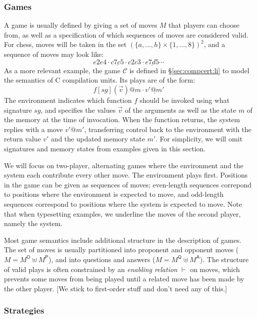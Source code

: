 \documentclass[acmsmall,timestamp,review,anonymous]{acmart}
\newcommand{\kw}[1]{\ensuremath{ \mathsf{#1} }}
\begin{document}

\subsubsection{Games} %

A game is usually defined by giving a set of moves $M$
that players can choose from,
as well as a specification of which
sequences of moves are considered valid.
For chess,
moves will be taken in the set $(\{a, \ldots, h\} \times \{1, \ldots, 8\})^2$,
and a sequence of moves may look like:
\[ e2e4 \cdot \underline{c7c5} \cdot c2c3 \cdot \underline{e7d5} \cdots \]
As a more relevant example,
the game $\mathcal{C}$ is defined in \S\ref{sec:compcert:li}
to model the semantics of C compilation units.
Its plays are of the form:
\[ f[sg](\vec{v})@m \cdot \underline{v'@m'} \]
The environment indicates
which function $f$ should be invoked
using what signature $sg$,
and specifies the values $\vec{v}$ of the arguments
as well as the state $m$ of the memory
at the time of invocation.
When the function returns,
the system replies with a move $v'@m'$,
transferring control back to the environment
with the return value $v'$
and the updated memory state $m'$.
For simplicity,
we will omit signatures and memory states
from examples given in this section.

We will focus on two-player, alternating games
where the environment and the system each contribute every other move.
The environment plays first.
Positions in the game can be given
as sequences of moves;
even-length sequences correpond to positions
where the environment is expected to move,
and odd-length sequences correspond to positions
where the system is expected to move.
Note that when typesetting examples,
we underline the moves of the second player,
namely the system.

Most game semantics
include additional structure
in the description of games.
The set of moves is usually partitioned
into proponent and opponent moves ($M = M^\kw{O} \uplus M^\kw{P}$),
and into questions and answers ($M = M^\kw{Q} \uplus M^\kw{A}$).
The structure of valid plays
is often constrained by an \emph{enabling relation} $\vdash$
on moves,
which prevents some moves from being played
until a related move has been made by the other player.
[We stick to first-order stuff and don't need any of this.]


\subsubsection{Strategies} %
\end{document}
